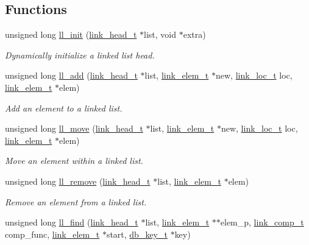 \subsection*{Functions}
\begin{CompactItemize}
\item 
unsigned long \hyperlink{group__dbprim__link_a5}{ll\_\-init} (\hyperlink{group__dbprim__link_a0}{link\_\-head\_\-t} $\ast$list, void $\ast$extra)
\begin{CompactList}\small\item\em Dynamically initialize a linked list head.\item\end{CompactList}\item 
unsigned long \hyperlink{group__dbprim__link_a6}{ll\_\-add} (\hyperlink{group__dbprim__link_a0}{link\_\-head\_\-t} $\ast$list, \hyperlink{group__dbprim__link_a1}{link\_\-elem\_\-t} $\ast$new, \hyperlink{group__dbprim__link_a4}{link\_\-loc\_\-t} loc, \hyperlink{group__dbprim__link_a1}{link\_\-elem\_\-t} $\ast$elem)
\begin{CompactList}\small\item\em Add an element to a linked list.\item\end{CompactList}\item 
unsigned long \hyperlink{group__dbprim__link_a7}{ll\_\-move} (\hyperlink{group__dbprim__link_a0}{link\_\-head\_\-t} $\ast$list, \hyperlink{group__dbprim__link_a1}{link\_\-elem\_\-t} $\ast$new, \hyperlink{group__dbprim__link_a4}{link\_\-loc\_\-t} loc, \hyperlink{group__dbprim__link_a1}{link\_\-elem\_\-t} $\ast$elem)
\begin{CompactList}\small\item\em Move an element within a linked list.\item\end{CompactList}\item 
unsigned long \hyperlink{group__dbprim__link_a8}{ll\_\-remove} (\hyperlink{group__dbprim__link_a0}{link\_\-head\_\-t} $\ast$list, \hyperlink{group__dbprim__link_a1}{link\_\-elem\_\-t} $\ast$elem)
\begin{CompactList}\small\item\em Remove an element from a linked list.\item\end{CompactList}\item 
unsigned long \hyperlink{group__dbprim__link_a9}{ll\_\-find} (\hyperlink{group__dbprim__link_a0}{link\_\-head\_\-t} $\ast$list, \hyperlink{group__dbprim__link_a1}{link\_\-elem\_\-t} $\ast$$\ast$elem\_\-p, \hyperlink{group__dbprim__link_a3}{link\_\-comp\_\-t} comp\_\-func, \hyperlink{group__dbprim__link_a1}{link\_\-elem\_\-t} $\ast$start, \hyperlink{group__dbprim_a0}{db\_\-key\_\-t} $\ast$key)
$$
\end{CompactItemize}
